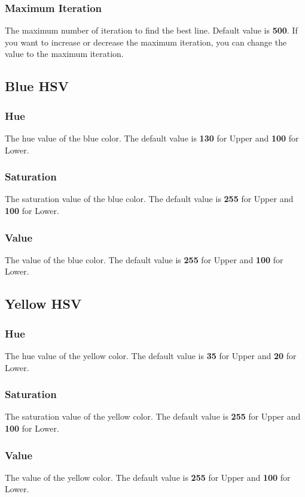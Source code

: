 \subsubsection{Maximum Iteration}
The maximum number of iteration to find the best line. Default value is \textbf{500}. If you want to increase or decrease the maximum iteration, you can change the value to the maximum iteration.

\subsection{Blue HSV}

\subsubsection{Hue}
The hue value of the blue color. The default value is \textbf{130} for Upper and \textbf{100} for Lower.

\subsubsection{Saturation}
The saturation value of the blue color. The default value is \textbf{255} for Upper and \textbf{100} for Lower.

\subsubsection{Value}
The value of the blue color. The default value is \textbf{255} for Upper and \textbf{100} for Lower.

\subsection{Yellow HSV}

\subsubsection{Hue}
The hue value of the yellow color. The default value is \textbf{35} for Upper and \textbf{20} for Lower.

\subsubsection{Saturation}
The saturation value of the yellow color. The default value is \textbf{255} for Upper and \textbf{100} for Lower.

\subsubsection{Value}
The value of the yellow color. The default value is \textbf{255} for Upper and \textbf{100} for Lower.

